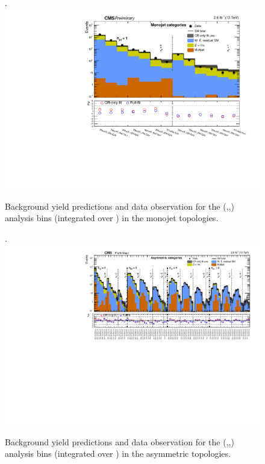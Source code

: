 \clearpage
\begin{landscape}
  \begin{center}
    \begin{figure}[h!]
      \caption{Background yield predictions and data observation for the (\njet,\nb,\scalht) analysis bins (integrated over \MHT) in the monojet topologies. \label{fig:summaryPlot_Monojet}}.
      \includegraphics[width=0.8\linewidth]{figures/postFitResults/summaryPlots/summaryPlot_Monojet_prefit_overlay_fit_b_CRFit}
    \end{figure}
  \end{center}
\end{landscape}

\clearpage
\begin{landscape}
  \begin{center}
    \begin{figure}[h!]
      \caption{Background yield predictions and data observation for the (\njet,\nb,\scalht) analysis bins (integrated over \MHT) in the asymmetric topologies. \label{fig:summaryPlot_Asymmetric}}.
      \includegraphics[width=0.8\linewidth]{figures/postFitResults/summaryPlots/summaryPlot_Asymmetric_prefit_overlay_fit_b_CRFit}
    \end{figure}
  \end{center}
\end{landscape}

